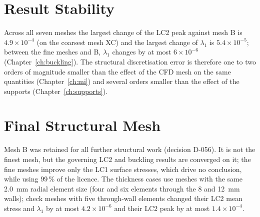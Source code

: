\section{Result Stability}
Across all seven meshes the largest change of the LC2 peak against mesh B is $4.9\times10^{-4}$ (on the coarsest mesh XC) and the largest
change of $\lambda_1$ is $5.4\times10^{-5}$; between the fine meshes and B, $\lambda_1$ changes by at most $6\times10^{-6}$ (Chapter~\ref{ch:buckling}).
The structural discretisation error is therefore one to two orders of magnitude smaller than the effect of the CFD mesh on the same quantities
(Chapter~\ref{ch:mi}) and several orders smaller than the effect of the supports (Chapter~\ref{ch:supports}).

\section{Final Structural Mesh}
Mesh B was retained for all further structural work (decision D-056). It is not the finest mesh, but the governing LC2 and buckling results are
converged on it; the fine meshes improve only the LC1 surface stresses, which drive no conclusion, while using 99\,\% of the licence. The
thickness cases use meshes with the same 2.0~mm radial element size (four and six elements through the 8 and 12~mm walls); check meshes with five
through-wall elements changed their LC2 mean stress and $\lambda_1$ by at most $4.2\times10^{-6}$ and their LC2 peak by at most $1.4\times10^{-4}$.
